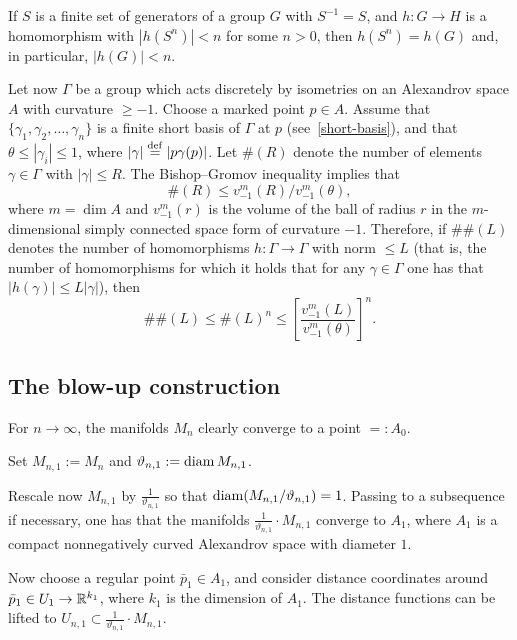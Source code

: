 \documentclass{amsart}
\begin{document}
\begin{tlem}\label{lem:triv}
If $S$ is a finite set of generators of a group $G$ with $S^{-1}=S$,
and $h\colon G\to H$ is a homomorphism with $|h(S^n)|< n$ for some $n>0$,
then $h(S^n)=h(G)$ and, in particular, $|h(G)|< n$.
\end{tlem}







Let now $\Gamma$ be a group which acts discretely
by isometries on an Alexandrov space $A$ with curvature $\ge -1$.
Choose a marked point $p\in A$.
Assume that $\{\gamma_1,\gamma_2,\ldots,\gamma_n\}$
is a finite short basis of $\Gamma$ at $p$ (see~\ref{short-basis}),
and that $\theta\le|\gamma_i|\le 1$,
where $|\gamma|\overset{\rm def}{=}|p\gamma(p)|$.
Let $\#(R)$
denote the number of elements $\gamma\in\Gamma$ with $|\gamma|\le R$.
The  Bishop--Gromov inequality implies that
$$\#(R)\le v^m_{-1}(R)/v^m_{-1}(\theta),$$
where $m=\dim A$ and $v^m_{-1}(r)$
is the volume of the ball of radius $r$
in the $m$-dimensional simply connected space form of curvature $-1$.
Therefore,
if $\#\#(L)$ denotes the number of homomorphisms
$h\colon \Gamma\to \Gamma$ with norm $\le L$
(that is, the number of homomorphisms
for which it holds that for any $\gamma\in\Gamma$
one has that $|h(\gamma)|\le L|\gamma|$),
then
\begin{equation}\label{e:hombd}
\#\#(L)\le \#(L)^n\le \left[\frac{v^m_{-1}(L)}{v^m_{-1}(\theta)}\right]^n.
\end{equation}



\subsection{The blow-up construction}\label{sec:constr}

For $n\to\infty$, the manifolds $M_n$ clearly converge to a point $=:A_0$.

Set $M_{n,1}:=M_n$ and $\vartheta_{n,1}:=\operatorname{\rm diam} M_{n,1}$.

Rescale now $M_{n,1}$ by $\frac{1}{\vartheta_{n,1}}$
so that $\operatorname{\rm diam}(M_{n,1}/\vartheta_{n,1})=1$.
Passing to a subsequence if necessary, one has
that the manifolds $\frac{1}{\vartheta_{n,1}}\cdot M_{n,1}$
converge to $A_1$,
where $A_1$
is a compact nonnegatively curved Alexandrov space with diameter $1$.

Now choose a regular point $\bar p_1\in A_1$,
and consider distance coordinates around $\bar p_1\in U_1\to {\Bbb R}^{k_1}$,
where $k_1$ is the dimension of $A_1$.
The distance functions can be lifted
to $U_{n,1}\subset \frac{1}{\vartheta_{n,1}}\cdot M_{n,1}$.
\end{document}
